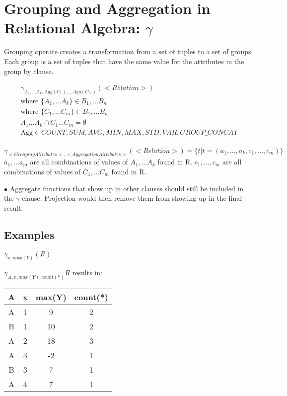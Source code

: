 \documentclass[twoside]{article}
\begin{document}
\section*{Grouping and Aggregation in Relational Algebra: $\gamma$}

Grouping operate creates a transformation from a set of tuples to a set of
groups. Each group is a set of tuples that have the same value for the
attributes in the group by clause.

\begin{gather*}
    \gamma_{A_1,\dots A_k, Agg(C_1),\dots Agg(C_m)}(<Relation>) \\
    \text{where } \{A_1,\dots A_k\} \in {B_1, \dots B_n} \\
    \text{where } \{C_1,\dots C_m\} \in {B_1, \dots B_n} \\
    {A_1 \dots A_k} \cap {C_1 \dots C_m} = \emptyset \\
    \text{Agg} \in {COUNT, SUM, AVG, MIN, MAX, STD, VAR, GROUP\_CONCAT} \\
\end{gather*}

$\gamma_{<Grouping Attributes>, <Aggregation Attributes>}(<Relation>) = \{ t |
t = (a_1,..., a_k, c_1,...,c_m)\}$ $a_1,...a_m$ are all combinations of values 
of $A_1,\dots A_k$ found in R. $c_1,...,c_m$ are all combinations of values of 
$C_1,\dots C_m$ found in R.

$\bullet$ Aggregate functions that show up in other clauses should still be 
included in the $\gamma$ clause. Projection would then remove them from showing 
up in the final result.

\subsection*{Examples}
$\gamma_{x, max(Y)}(R)$

$\gamma_{A, x, max(Y), count(*)}{R}$ results in:

\begin{table}[!htb]
    \centering
    \begin{tabular}{|c|c|c|c|}
        \hline
        A & x & max(Y) & count(*) \\
        \hline
        A & 1 & 9 & 2 \\
        \hline
        B & 1 & 10 & 2 \\
        \hline
        A & 2 & 18 & 3 \\
        \hline
        A & 3 & -2 & 1 \\
        \hline
        B & 3 & 7 & 1 \\
        \hline
        A & 4 & 7 & 1 \\
        \hline
    \end{tabular}
\end{table}
\end{document}
